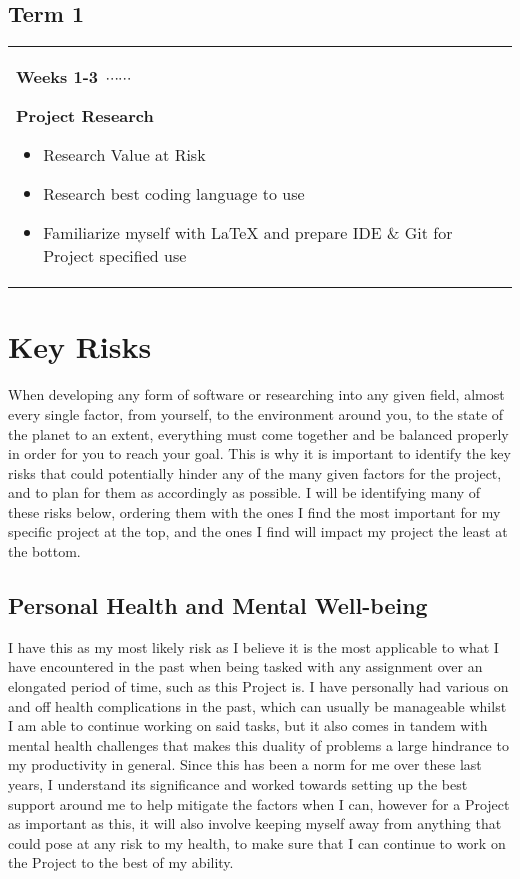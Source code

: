 \documentclass{article}
\newcommand\ytl[2]{
    \parbox[b]{12em}{\hfill{\color{cyan}\bfseries\sffamily #1}~$\cdots\cdots$~}\makebox[0pt][c]{$\bullet$}\vrule\quad \parbox[c]{10cm}{\vspace{6pt}\color[RGB]{20, 20, 90}\raggedright\sffamily #2\par}\\[-2pt]
}
\begin{document}
\subsection{Term 1}
\vspace{-2\baselineskip}
\begin{table}[H]
  \centering
  \color{black}
  \begin{longtable}{p{1\linewidth}}
      \endfirsthead
      \endhead
      \ytl{Weeks 1-3}{
        \textbf{Project Research}
          \vspace{8pt}
          \begin{itemize}
              \item Research Value at Risk
              \item Research best coding language to use
              \item Familiarize myself with LaTeX and prepare IDE \& Git for Project specified use
          \end{itemize}
      } 
  \end{longtable}
  \end{table}

\section{Key Risks}
When developing any form of software or researching into any given field, almost every single factor, from yourself, to the environment around you, to the state of the planet to an extent, everything must come together and be balanced properly in order for you to reach your goal. This is why it is important to identify the key risks that could potentially hinder any of the many given factors for the project, and to plan for them as accordingly as possible. I will be identifying many of these risks below, ordering them with the ones I find the most important for my specific project at the top, and the ones I find will impact my project the least at the bottom.

\subsection{Personal Health and Mental Well-being}
I have this as my most likely risk as I believe it is the most applicable to what I have encountered in the past when being tasked with any assignment over an elongated period of time, such as this Project is. I have personally had various on and off health complications in the past, which can usually be manageable whilst I am able to continue working on said tasks, but it also comes in tandem with mental health challenges that makes this duality of problems a large hindrance to my productivity in general. Since this has been a norm for me over these last years, I understand its significance and worked towards setting up the best support around me to help mitigate the factors when I can, however for a Project as important as this, it will also involve keeping myself away from anything that could pose at any risk to my health, to make sure that I can continue to work on the Project to the best of my ability.
\end{document}

